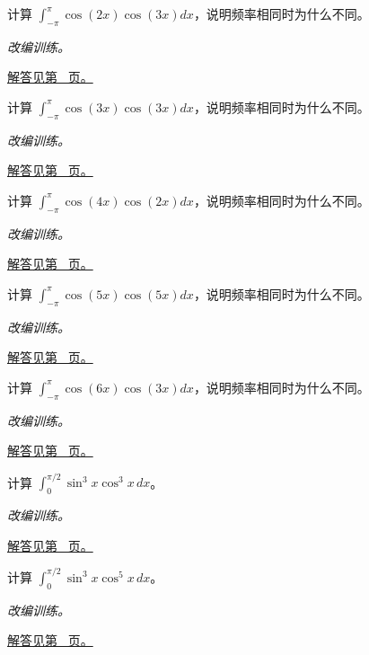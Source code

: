 \documentclass[12pt,fontset=fandol]{ctexart}
\begin{document}
\begin{example}[余弦函数的正交积分]\label{ex:c16q14}
计算 $\int_{-\pi}^\pi\cos(2x)\cos(3x)dx$，说明频率相同时为什么不同。
\par\textit{改编训练。}\par\hyperref[ans:c16q14]{解答见第~\pageref{ans:c16q14} 页。}
\end{example}
\begin{example}[余弦函数的正交积分]\label{ex:c16q15}
计算 $\int_{-\pi}^\pi\cos(3x)\cos(3x)dx$，说明频率相同时为什么不同。
\par\textit{改编训练。}\par\hyperref[ans:c16q15]{解答见第~\pageref{ans:c16q15} 页。}
\end{example}
\begin{example}[余弦函数的正交积分]\label{ex:c16q16}
计算 $\int_{-\pi}^\pi\cos(4x)\cos(2x)dx$，说明频率相同时为什么不同。
\par\textit{改编训练。}\par\hyperref[ans:c16q16]{解答见第~\pageref{ans:c16q16} 页。}
\end{example}
\begin{example}[余弦函数的正交积分]\label{ex:c16q17}
计算 $\int_{-\pi}^\pi\cos(5x)\cos(5x)dx$，说明频率相同时为什么不同。
\par\textit{改编训练。}\par\hyperref[ans:c16q17]{解答见第~\pageref{ans:c16q17} 页。}
\end{example}
\begin{example}[余弦函数的正交积分]\label{ex:c16q18}
计算 $\int_{-\pi}^\pi\cos(6x)\cos(3x)dx$，说明频率相同时为什么不同。
\par\textit{改编训练。}\par\hyperref[ans:c16q18]{解答见第~\pageref{ans:c16q18} 页。}
\end{example}
\begin{example}[两种奇次幂的混合积分]\label{ex:c16q19}
计算 $\int_0^{\pi/2}\sin^{3}x\cos^{3}x\,dx$。
\par\textit{改编训练。}\par\hyperref[ans:c16q19]{解答见第~\pageref{ans:c16q19} 页。}
\end{example}
\begin{example}[两种奇次幂的混合积分]\label{ex:c16q20}
计算 $\int_0^{\pi/2}\sin^{3}x\cos^{5}x\,dx$。
\par\textit{改编训练。}\par\hyperref[ans:c16q20]{解答见第~\pageref{ans:c16q20} 页。}
\end{example}
\end{document}
